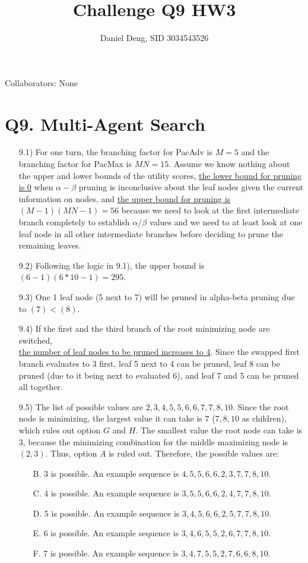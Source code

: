 \documentclass[11pt]{article}
\title{Challenge Q9 HW3}
\author{Daniel Deng, SID 3034543526}
\date{}
\theoremstyle{definition}
\theoremstyle{remark}
\begin{document}
\maketitle

Collaborators: None
\newpage
\section*{Q9. Multi-Agent Search}
\begin{enumerate}
\item[9.1)]
For one turn, the branching factor for PacAdv is $M=5$ and the branching factor for PacMax is $MN=15$. Assume we know nothing about the upper and lower bounds of the utility scores, \underline{the lower bound for pruning is 0} when $\alpha-\beta$ pruning is inconclusive about the leaf nodes given the current information on nodes, and \underline{the upper bound for pruning is $(M-1)(MN-1)=56$} because we need to look at the first intermediate branch completely to establish $\alpha$/$\beta$ values and  we need to at least look at one leaf node in all other intermediate branches before deciding to prune the remaining leaves.

\item[9.2)]
Following the logic in 9.1), the upper bound is $(6-1)(6* 10 - 1)=295$.

\item[9.3)]
One 1 leaf node (5 next to 7) will be pruned in alpha-beta pruning due to $(7) < (8)$.

\item[9.4)]
If the first and the third branch of the root minimizing node are switched,\\ \underline{the number of leaf nodes to be pruned increases to 4}. Since the swapped first branch evaluates to 3 first, leaf 5 next to 4 can be pruned, leaf 8 can be pruned (due to it being next to evaluated 6), and leaf 7 and 5 can be pruned all together.

\item[9.5)]
The list of possible values are $2,3,4,5,5,6,6,7,7,8,10$. Since the root node is minimizing, the largest value it can take is $7$ ($7,8,10$ as children), which rules out option $G$ and $H$. The smallest value the root node can take is $3$, because the minimizing combination for the middle maximizing node is $(2,3)$. Thus, option $A$ is ruled out. Therefore, the possible values are:
\begin{enumerate}
\item[B.] 3 is possible. An example sequence is $4,5,5,6,6,2,3,7,7,8,10$.
\item[C.] 4 is possible. An example sequence is $3,5,5,6,6,2,4,7,7,8,10$.
\item[D.] 5 is possible. An example sequence is $3,4,5,6,6,2,5,7,7,8,10$.
\item[E.] 6 is possible. An example sequence is $3,4,6,5,5,2,6,7,7,8,10$.
\item[F.] 7 is possible. An example sequence is $3,4,7,5,5,2,7,6,6,8,10$.
\end{enumerate}
\end{enumerate}
\end{document}
